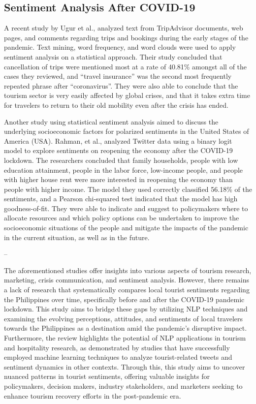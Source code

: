 \documentclass[journal]{./IEEE/IEEEtran}
\begin{document}
\subsection*{Sentiment Analysis After COVID-19}

A recent study by Ugur et al., \cite{one:ugur2020impacts} analyzed text from TripAdvisor documents, web pages, and comments regarding trips and bookings during the early stages of the pandemic. Text mining, word frequency, and word clouds were used to apply sentiment analysis on a statistical approach. Their study concluded that cancellation of trips were mentioned most at a rate of 40.81\% amongst all of the cases they reviewed, and “travel insurance” was the second most frequently repeated phrase after “coronavirus”. They were also able to conclude that the tourism sector is very easily affected by global crises, and that it takes extra time for travelers to return to their old mobility even after the crisis has ended. 

Another study using statistical sentiment analysis aimed to discuss the underlying socioeconomic factors for polarized sentiments in the United States of America (USA). Rahman, et al., \cite{nine:RAHMAN2021e06200} analyzed Twitter data using a binary logit model to explore sentiments on reopening the economy after the COVID-19 lockdown. The researchers concluded that family households, people with low education attainment, people in the labor force, low-income people, and people with higher house rent were more interested in reopening the economy than people with higher income. The model they used correctly classified 56.18\% of the sentiments, and a Pearson chi-squared test indicated that the model has high goodness-of-fit. They were able to indicate and suggest to policymakers where to allocate resources and which policy options can be undertaken to improve the socioeconomic situations of the people and mitigate the impacts of the pandemic in the current situation, as well as in the future. 

--

The aforementioned studies offer insights into various aspects of tourism research, marketing, crisis communication, and sentiment analysis. However, there remains a lack of research that systematically compares local tourist sentiments regarding the Philippines over time, specifically before and after the COVID-19 pandemic lockdown. This study aims to bridge these gaps by utilizing NLP techniques and examining the evolving perceptions, attitudes, and sentiments of local travelers towards the Philippines as a destination amid the pandemic’s disruptive impact. Furthermore, the review highlights the potential of NLP applications in tourism and hospitality research, as demonstrated by studies that have successfully employed machine learning techniques to analyze tourist-related tweets and sentiment dynamics in other contexts. Through this, this study aims to uncover nuanced patterns in tourist sentiments, offering valuable insights for policymakers, decision makers, industry stakeholders, and marketers seeking to enhance tourism recovery efforts in the post-pandemic era.
\end{document}

